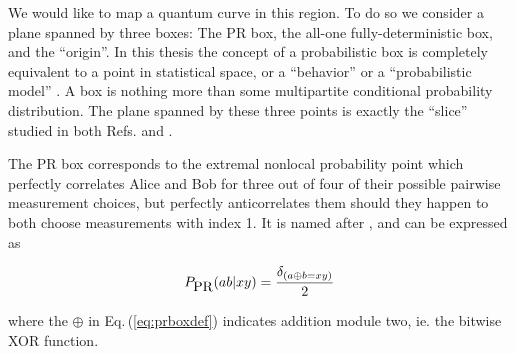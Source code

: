 \documentclass[
  12pt          %
  ,letterpaper  %
  ,center       %
  ,noupper      %
  ,english,fleqn]{uconnthesis}
\newcommand{\LeftEqns}[1]{\begin{fleqn}[\leftmargini minus \leftmargini]\begin{align}#1\end{align}\end{fleqn}}
\newcommand{\LeftEqn}[1]{\LeftEqns{\begin{split}#1\end{split}}}
\newcommand{\ceq}[1]{Eq.\,(\ref{#1})}
\begin{document}
We would like to map a quantum curve in this region. To do so we consider a plane spanned by three boxes: The PR box, the all-one fully-deterministic box, and the ``origin''. In this thesis the concept of a probabilistic box is completely equivalent to a point in statistical space, or a  ``behavior'' \cite{NPA2008Long} or a ``probabilistic model'' \cite{FritzCombinatorialLong}. A box is nothing more than some multipartite conditional probability distribution. The plane spanned by these three points is exactly the ``slice'' studied in both Refs. \citep[Fig. 3]{ICRecovery} and \citep[Fig. 4]{LONatureComm}. 

The PR box \cite{PROriginal,PRUnit,Brunner2013Bell,PopescuReviewNatureComm,ScaraniNotes,*ScaraniNotes2} corresponds to the extremal nonlocal probability point which perfectly correlates Alice and Bob for three out of four of their possible pairwise measurement choices, but perfectly anticorrelates them should they happen to both choose measurements with index 1. It is named after \citet{PROriginal}, and can be expressed as
\LeftEqn{\label{eq:prboxdef}
P_{\mbox{PR}}(ab|xy) = \frac{\mathlarger{\delta_{\left(a\oplus b  = x y\right)}}}{2}
} 
where the $\oplus$ in \ceq{eq:prboxdef} indicates addition module two, ie. the bitwise XOR function.
\end{document}
